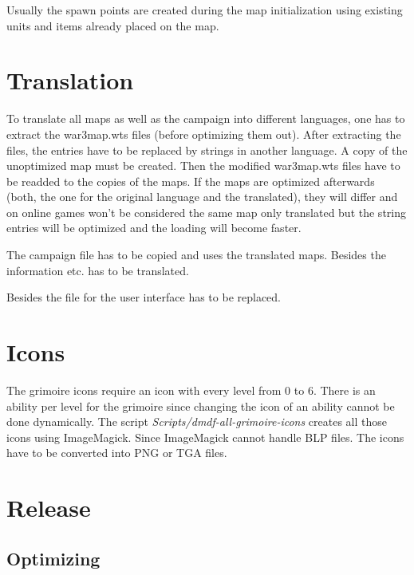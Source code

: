 \documentclass[a4paper,12pt,titlepage]{report}
\begin{document}
Usually the spawn points are created during the map initialization using existing units and items already placed on the map.

\newpage

\chapter{Translation}

To translate all maps as well as the campaign into different languages, one has to extract the war3map.wts files (before optimizing them out). After extracting the files, the entries have to be replaced by strings in another language. A copy of the unoptimized map must be created. Then the modified war3map.wts files have to be readded to the copies of the maps. If the maps are optimized afterwards (both, the one for the original language and the translated), they will differ and on online games won't be considered the same map only translated but the string entries will be optimized and the loading will become faster.

\vspace{\baselineskip}

The campaign file has to be copied and uses the translated maps. Besides the information etc. has to be translated.

\vspace{\baselineskip}

Besides the file for the user interface has to be replaced.

\newpage

\chapter{Icons}

The grimoire icons require an icon with every level from 0 to 6. There is an ability per level for the grimoire since changing the icon of an ability cannot be done dynamically. The script \emph{Scripts/dmdf-all-grimoire-icons} creates all those icons using ImageMagick. Since ImageMagick cannot handle BLP files. The icons have to be converted into PNG or TGA files.

\newpage

\chapter{Release}

\section{Optimizing}
\end{document}
